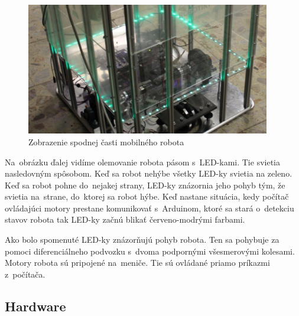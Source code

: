 \begin{figure}[!htbp]
	\begin{center}
		\includegraphics[width=0.95\textwidth]{img/robot.png}
	\end{center}
	\caption{Zobrazenie spodnej časti mobilného robota~\cite{timovyProjekt}}
	\label{fig:robot}
\end{figure}

\noindent Na~obrázku ďalej vidíme olemovanie robota pásom s~LED-kami. Tie svietia nasledovným spôsobom. Keď sa robot nehýbe všetky LED-ky svietia
na zeleno. Keď sa robot pohne do~nejakej strany, LED-ky znázornia jeho pohyb tým, že svietia na~strane, do~ktorej sa robot hýbe. Keď nastane
situácia, kedy počítač ovládajúci motory prestane komunikovať s~Arduinom, ktoré sa stará o~detekciu stavov robota tak LED-ky začnú blikať
červeno-modrými farbami.

Ako bolo spomenuté LED-ky znázorňujú pohyb robota. Ten sa pohybuje za pomoci diferenciálneho podvozku s~dvoma podpornými všesmerovými kolesami.
Motory robota sú pripojené na~meniče. Tie sú ovládané priamo príkazmi z~počítača.

\subsection{Hardware}

